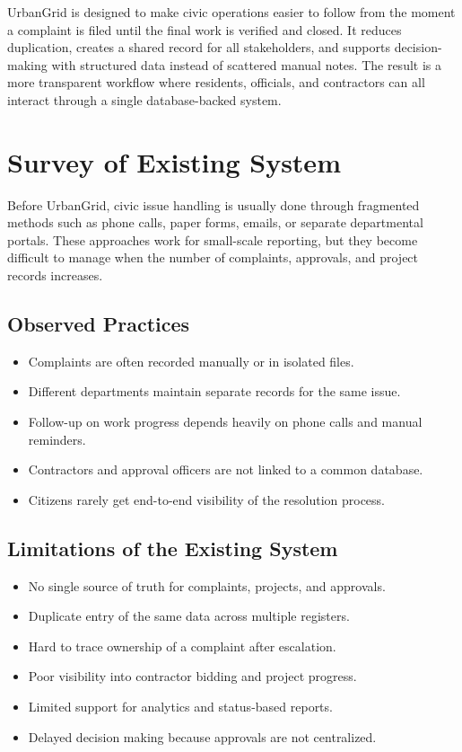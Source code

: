 \documentclass[12pt,a4paper,oneside,openany]{report}
\begin{document}
UrbanGrid is designed to make civic operations easier to follow from the moment a complaint is filed until the final work is verified and closed. It reduces duplication, creates a shared record for all stakeholders, and supports decision-making with structured data instead of scattered manual notes. The result is a more transparent workflow where residents, officials, and contractors can all interact through a single database-backed system.

\chapter*{Survey of Existing System}
{}
Before UrbanGrid, civic issue handling is usually done through fragmented methods such as phone calls, paper forms, emails, or separate departmental portals. These approaches work for small-scale reporting, but they become difficult to manage when the number of complaints, approvals, and project records increases.

\section*{Observed Practices}
\begin{itemize}[leftmargin=*]
  \item Complaints are often recorded manually or in isolated files.
  \item Different departments maintain separate records for the same issue.
  \item Follow-up on work progress depends heavily on phone calls and manual reminders.
  \item Contractors and approval officers are not linked to a common database.
  \item Citizens rarely get end-to-end visibility of the resolution process.
\end{itemize}

\section*{Limitations of the Existing System}


\begin{itemize}[leftmargin=*]
  \item No single source of truth for complaints, projects, and approvals.
  \item Duplicate entry of the same data across multiple registers.
  \item Hard to trace ownership of a complaint after escalation.
  \item Poor visibility into contractor bidding and project progress.
  \item Limited support for analytics and status-based reports.
  \item Delayed decision making because approvals are not centralized.
\end{itemize}
\end{document}

